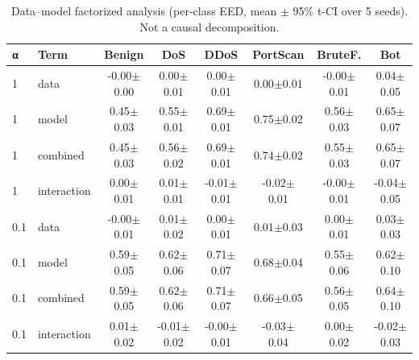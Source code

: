 \begin{table}[t]
\centering
\caption{Data--model factorized analysis (per-class EED, mean $\pm$ 95\% t-CI over 5 seeds). Not a causal decomposition.}
\label{tab:factorized}
\scriptsize
\setlength{\tabcolsep}{3pt}
\begin{tabular}{llcccccc}
\toprule
α & Term & Benign & DoS & DDoS & PortScan & BruteF. & Bot \\
\midrule
1 & data & -0.00$\pm$0.00 & 0.00$\pm$0.01 & 0.00$\pm$0.01 & 0.00$\pm$0.01 & -0.00$\pm$0.01 & 0.04$\pm$0.05 \\
1 & model & 0.45$\pm$0.03 & 0.55$\pm$0.01 & 0.69$\pm$0.01 & 0.75$\pm$0.02 & 0.56$\pm$0.03 & 0.65$\pm$0.07 \\
1 & combined & 0.45$\pm$0.03 & 0.56$\pm$0.02 & 0.69$\pm$0.01 & 0.74$\pm$0.02 & 0.55$\pm$0.03 & 0.65$\pm$0.07 \\
1 & interaction & 0.00$\pm$0.01 & 0.01$\pm$0.01 & -0.01$\pm$0.01 & -0.02$\pm$0.01 & -0.00$\pm$0.01 & -0.04$\pm$0.05 \\
\midrule
0.1 & data & -0.00$\pm$0.01 & 0.01$\pm$0.02 & 0.00$\pm$0.01 & 0.01$\pm$0.03 & 0.00$\pm$0.01 & 0.03$\pm$0.03 \\
0.1 & model & 0.59$\pm$0.05 & 0.62$\pm$0.06 & 0.71$\pm$0.07 & 0.68$\pm$0.04 & 0.55$\pm$0.06 & 0.62$\pm$0.10 \\
0.1 & combined & 0.59$\pm$0.05 & 0.62$\pm$0.06 & 0.71$\pm$0.07 & 0.66$\pm$0.05 & 0.56$\pm$0.05 & 0.64$\pm$0.10 \\
0.1 & interaction & 0.01$\pm$0.02 & -0.01$\pm$0.02 & -0.00$\pm$0.01 & -0.03$\pm$0.04 & 0.00$\pm$0.02 & -0.02$\pm$0.03 \\
\bottomrule
\end{tabular}
\end{table}